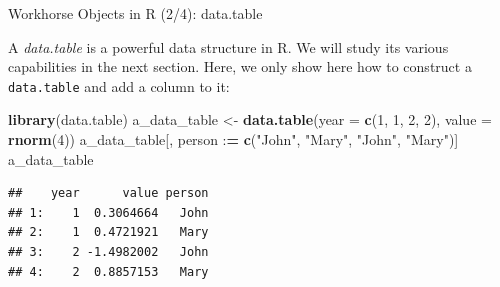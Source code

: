 \documentclass[10pt,ignorenonframetext,]{beamer}
\newenvironment{Shaded}{\begin{snugshade}}{\end{snugshade}}
\newcommand{\KeywordTok}[1]{\textcolor[rgb]{0.13,0.29,0.53}{\textbf{{#1}}}}
\newcommand{\DataTypeTok}[1]{\textcolor[rgb]{0.13,0.29,0.53}{{#1}}}
\newcommand{\DecValTok}[1]{\textcolor[rgb]{0.00,0.00,0.81}{{#1}}}
\newcommand{\StringTok}[1]{\textcolor[rgb]{0.31,0.60,0.02}{{#1}}}
\newcommand{\ErrorTok}[1]{\textcolor[rgb]{0.64,0.00,0.00}{\textbf{{#1}}}}
\newcommand{\NormalTok}[1]{{#1}}
\begin{document}
\begin{frame}[fragile]{Workhorse Objects in R (2/4): data.table}

A \emph{data.table} is a powerful data structure in R. We will study its
various capabilities in the next section. Here, we only show here how to
construct a \texttt{data.table} and add a column to it:

\footnotesize

\begin{Shaded}
\begin{Highlighting}[]
\KeywordTok{library}\NormalTok{(data.table)}
\NormalTok{a_data_table <-}\StringTok{ }\KeywordTok{data.table}\NormalTok{(}\DataTypeTok{year =} \KeywordTok{c}\NormalTok{(}\DecValTok{1}\NormalTok{, }\DecValTok{1}\NormalTok{, }\DecValTok{2}\NormalTok{, }\DecValTok{2}\NormalTok{), }\DataTypeTok{value =} \KeywordTok{rnorm}\NormalTok{(}\DecValTok{4}\NormalTok{))}
\NormalTok{a_data_table[, person :}\ErrorTok{=}\StringTok{ }\KeywordTok{c}\NormalTok{(}\StringTok{"John"}\NormalTok{, }\StringTok{"Mary"}\NormalTok{, }\StringTok{"John"}\NormalTok{, }\StringTok{"Mary"}\NormalTok{)]}
\NormalTok{a_data_table}
\end{Highlighting}
\end{Shaded}

\begin{verbatim}
##    year      value person
## 1:    1  0.3064664   John
## 2:    1  0.4721921   Mary
## 3:    2 -1.4982002   John
## 4:    2  0.8857153   Mary
\end{verbatim}

\normalsize

\end{frame}
\end{document}
